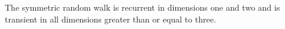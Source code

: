 The symmetric random walk is recurrent in dimensions one and two and is transient in all dimensions greater than or equal to three.
